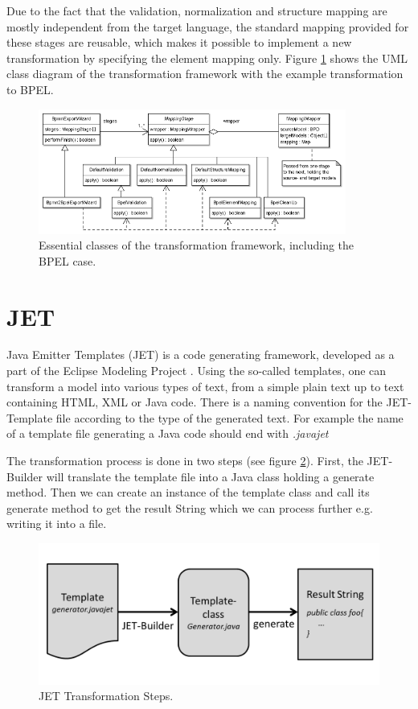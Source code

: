 Due to the fact that the validation, normalization and structure mapping are mostly independent from the target language, the standard mapping provided for these stages are reusable, which makes it possible to implement a new transformation by specifying the element mapping only. Figure \ref{fig:transform} shows the UML class diagram of the transformation framework with the example transformation to BPEL.
\begin{figure}[h]
	\centering
		\includegraphics[width=0.90\textwidth]{images/transformation.png}
	\caption{Essential classes of the transformation framework, including the BPEL case.\cite{TK07}}
	\label{fig:transform}
\end{figure}



\newpage
\section{JET}
Java Emitter Templates (JET) \cite{JETWEB} is a code generating framework, developed as a part of the Eclipse Modeling Project \cite{EMPWEB}. Using the so-called templates, one can transform a model into various types of text, from a simple plain text up to text containing HTML, XML or Java code. There is a naming convention for the JET-Template file according to the type of the generated text. For example the name of a template file generating a Java code should end with \textit{.javajet}

The transformation process is done in two steps (see figure \ref{fig:jet_process}). First, the JET-Builder will translate the template file into a Java class holding a generate method. Then we can create an instance of the template class and call its generate method to get the result String which we can process further e.g. writing it into a file. 
\begin{figure}[h]
  \label{fig:jet_process}
	\centering
		\includegraphics[width=1.0\textwidth]{images/jet_process.png}
	\caption{JET Transformation Steps.}
\end{figure}\\

